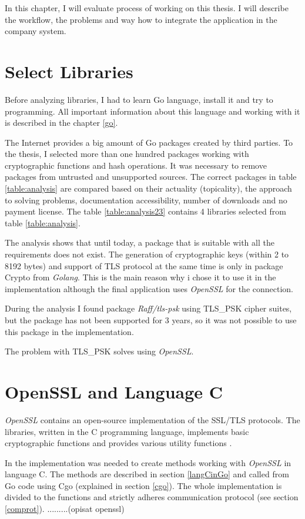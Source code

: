 \documentclass[
  twoside, 12pt, 
  printed, %
  notable,   %
  lof,     %
  lot,     %
]{fithesis3}
\begin{document}
In this chapter, I will evaluate process of working on this thesis. I will describe the workflow, 
the problems and way how to integrate the application in the company system.

\section{Select Libraries}
Before analyzing libraries, I had to learn Go language, install it and try to programming. All 
important information about this language and working with it is described in the chapter 
\ref{go}. 

The Internet provides a big amount of Go packages created by third parties. To the thesis, I 
selected more than one hundred packages working with cryptographic functions and hash operations. 
It was necessary to remove packages from untrusted and unsupported sources. The correct packages 
in table \ref{table:analysis} are compared based on their actuality (topicality), the approach to 
solving problems, documentation accessibility, number of downloads and no payment license. The 
table \ref{table:analysis23} contains 4 libraries selected from table \ref{table:analysis}. 

The analysis shows that until today, a package that is suitable with all the requirements does not 
exist. The generation of cryptographic keys (within 2 to 8192 bytes) and support of TLS protocol at 
the same time is only in package Crypto from \textit{Golang}. This is the main reason why i chose it to use it in the implementation although the final application uses \textit{OpenSSL} for the connection.

During the analysis I found package \textit{Raff/tls-psk} using TLS\_PSK cipher suites, but the 
package has not been supported for 3 years, so it was not possible to use this package in the 
implementation. 

The problem with TLS\_PSK solves using \textit{OpenSSL}.

\section{OpenSSL and Language C}

\textit{OpenSSL} contains an open-source implementation of the SSL/TLS protocols. The libraries, 
written in the C programming language, implements basic cryptographic functions and provides 
various utility functions \cite{foundation}. 

In the implementation was needed to create methods working with \textit{OpenSSL} in language C. 
The methods are described in section \ref{langCinGo} and called from Go code using Cgo (explained 
in section \ref{cgo}). The whole implementation is divided to the functions and strictly adheres communication protocol (see section \ref{comprot}). .........(opisat openssl)
\end{document}
